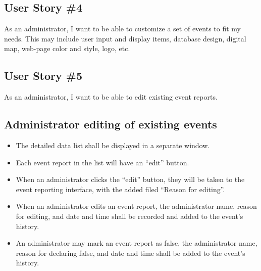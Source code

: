 \subsection{User Story \#4} 
As an administrator, I want to be able to customize a set of events to fit my needs. This may include user input and display items, database design, digital map, web-page color and style, logo, etc. 
\subsection{User Story \#5} 
As an administrator, I want to be able to edit existing event reports.

\subsection{Administrator editing of existing events}
\begin{itemize}
\item The detailed data list shall be displayed in a separate window.
\item Each event report in the list will have an ``edit'' button.
\item When an administrator clicks the ``edit'' button, they will be taken to the event reporting interface, with the added filed ``Reason for editing''.
\item When an administrator edits an event report, the administrator name, reason for editing, and date and time shall be recorded and added to the event's history.
\item An administrator may mark an event report as false, the administrator name, reason for declaring false, and date and time shall be added to the event's history.
\end{itemize}

